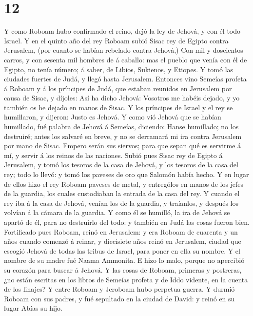 \hypertarget{section-11}{%
\section{12}\label{section-11}}

 Y como Roboam hubo confirmado el reino, dejó la ley de
Jehová, y con él todo Israel.  Y en el quinto año del rey
Roboam subió Sisac rey de Egipto contra Jerusalem, (por cuanto se habían
rebelado contra Jehová,)  Con mil y doscientos carros, y
con sesenta mil hombres de á caballo: mas el pueblo que venía con él de
Egipto, no tenía número; á saber, de Libios, Sukienos, y Etiopes.
 Y tomó las ciudades fuertes de Judá, y llegó hasta
Jerusalem.  Entonces vino Semeías profeta á Roboam y á los
príncipes de Judá, que estaban reunidos en Jerusalem por causa de Sisac,
y díjoles: Así ha dicho Jehová: Vosotros me habéis dejado, y yo también
os he dejado en manos de Sisac.  Y los príncipes de Israel
y el rey se humillaron, y dijeron: Justo es Jehová.  Y
como vió Jehová que se habían humillado, fué palabra de Jehová á
Semeías, diciendo: Hanse humillado; no los destruiré; antes los salvaré
en breve, y no se derramará mi ira contra Jerusalem por mano de Sisac.
 Empero serán sus siervos; para que sepan qué es servirme
á mí, y servir á los reinos de las naciones.  Subió pues
Sisac rey de Egipto á Jerusalem, y tomó los tesoros de la casa de
Jehová, y los tesoros de la casa del rey; todo lo llevó: y tomó los
paveses de oro que Salomón había hecho.  Y en lugar de
ellos hizo el rey Roboam paveses de metal, y entrególos en manos de los
jefes de la guardia, los cuales custodiaban la entrada de la casa del
rey.  Y cuando el rey iba á la casa de Jehová, venían los
de la guardia, y traíanlos, y después los volvían á la cámara de la
guardia.  Y como él se humilló, la ira de Jehová se
apartó de él, para no destruirlo del todo: y también en Judá las cosas
fueron bien.  Fortificado pues Roboam, reinó en
Jerusalem: y era Roboam de cuarenta y un años cuando comenzó á reinar, y
diecisiete años reinó en Jerusalem, ciudad que escogió Jehová de todas
las tribus de Israel, para poner en ella su nombre. Y el nombre de su
madre fué Naama Ammonita.  E hizo lo malo, porque no
apercibió su corazón para buscar á Jehová.  Y las cosas
de Roboam, primeras y postreras, ¿no están escritas en los libros de
Semeías profeta y de Iddo vidente, en la cuenta de los linajes? Y entre
Roboam y Jeroboam hubo perpetua guerra.  Y durmió Roboam
con sus padres, y fué sepultado en la ciudad de David: y reinó en su
lugar Abías su hijo.

